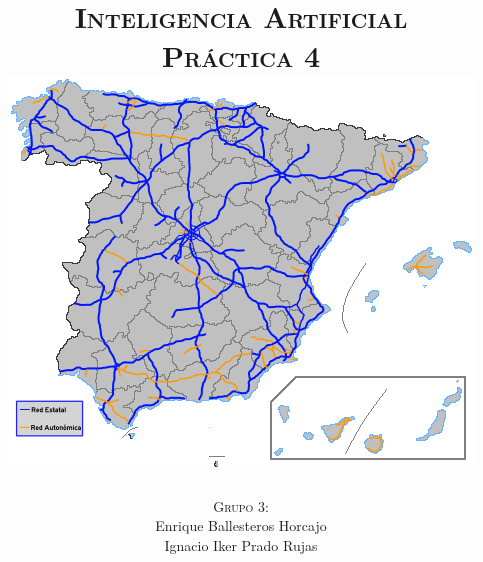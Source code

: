 \documentclass[11pt, a4paper, spanish, openright, twoside]{book}
\begin{document}
 
\title{\Huge{\textsc{Inteligencia Artificial}} \\
	\vspace{0.7cm}
	 \textsc{\Large{Práctica 4}} \\
	\vspace{1.5cm}
	\includegraphics[scale=0.45]{mapaCarreteras}}
\author{\textsc{Grupo 3:}\\
	Enrique Ballesteros Horcajo\\
	Ignacio Iker Prado Rujas}
\date{\Today}
\maketitle

\newpage
\mbox{}
\thispagestyle{empty}						%
\newpage


\tableofcontents 							%

\newpage
\mbox{}
\thispagestyle{empty}						%
\newpage


\vspace{3cm}


\newpage
\end{document}

